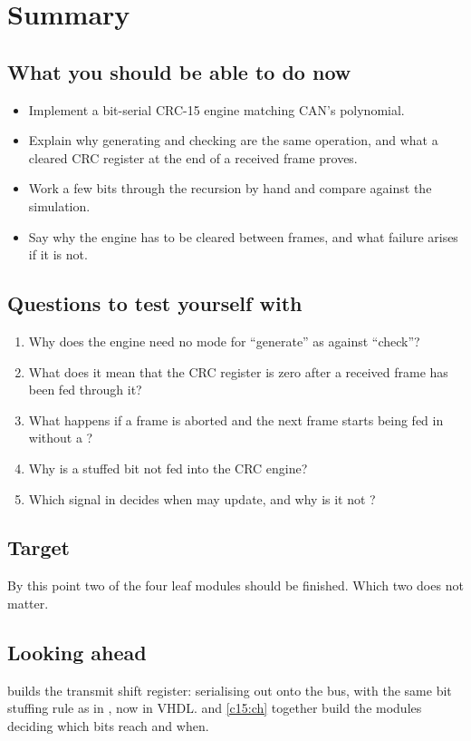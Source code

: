 
\section{Summary}
\label{c13:sec:review}

\subsection*{What you should be able to do now}
\begin{itemize}
  \item Implement a bit-serial CRC-15 engine matching CAN's polynomial.
  \item Explain why generating and checking are the same operation, and what a cleared CRC register
    at the end of a received frame proves.
  \item Work a few bits through the recursion by hand and compare against the simulation.
  \item Say why the engine has to be cleared between frames, and what failure arises if it is not.
\end{itemize}

\subsection*{Questions to test yourself with}
\begin{enumerate}
  \item Why does the engine need no mode for ``generate'' as against ``check''?
  \item What does it mean that the CRC register is zero after a received frame has been fed through
    it?
  \item What happens if a frame is aborted and the next frame starts being fed in without a
    ?
  \item Why is a stuffed bit not fed into the CRC engine?
  \item Which signal in  decides when  may update, and why is it not
    ?
\end{enumerate}

\subsection*{Target}
By this point two of the four leaf modules should be finished. Which two does not matter.

\subsection*{Looking ahead}
 builds the transmit shift register: serialising out onto the bus, with the same bit
stuffing rule as in , now in VHDL.  and \ref{c15:ch} together build
the modules deciding which bits reach  and when.

